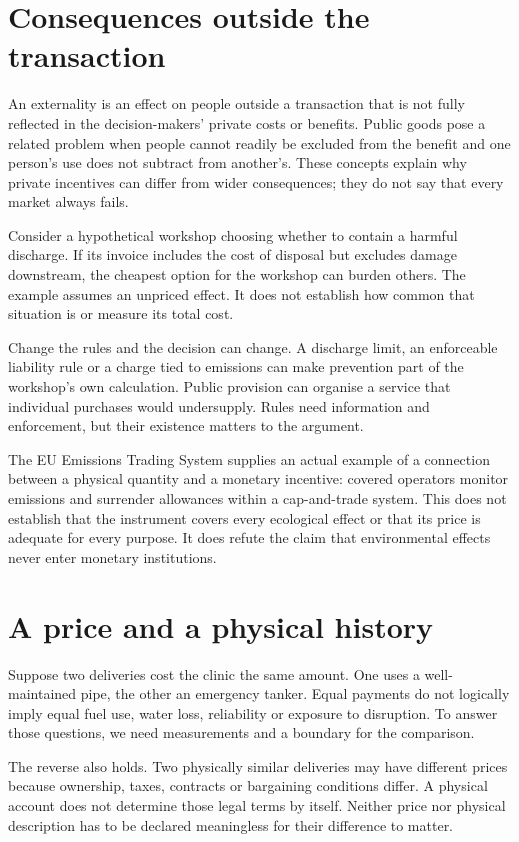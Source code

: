 \section{Consequences outside the transaction}
An externality is an effect on people outside a transaction that is not fully reflected in the decision-makers' private costs or benefits. Public goods pose a related problem when people cannot readily be excluded from the benefit and one person's use does not subtract from another's. These concepts explain why private incentives can differ from wider consequences; they do not say that every market always fails.\cite{externalities}

Consider a hypothetical workshop choosing whether to contain a harmful discharge. If its invoice includes the cost of disposal but excludes damage downstream, the cheapest option for the workshop can burden others. The example assumes an unpriced effect. It does not establish how common that situation is or measure its total cost.

Change the rules and the decision can change. A discharge limit, an enforceable liability rule or a charge tied to emissions can make prevention part of the workshop's own calculation. Public provision can organise a service that individual purchases would undersupply. Rules need information and enforcement, but their existence matters to the argument.

The EU Emissions Trading System supplies an actual example of a connection between a physical quantity and a monetary incentive: covered operators monitor emissions and surrender allowances within a cap-and-trade system. This does not establish that the instrument covers every ecological effect or that its price is adequate for every purpose. It does refute the claim that environmental effects never enter monetary institutions.\cite{ets}

\section{A price and a physical history}
Suppose two deliveries cost the clinic the same amount. One uses a well-maintained pipe, the other an emergency tanker. Equal payments do not logically imply equal fuel use, water loss, reliability or exposure to disruption. To answer those questions, we need measurements and a boundary for the comparison.

The reverse also holds. Two physically similar deliveries may have different prices because ownership, taxes, contracts or bargaining conditions differ. A physical account does not determine those legal terms by itself. Neither price nor physical description has to be declared meaningless for their difference to matter.

